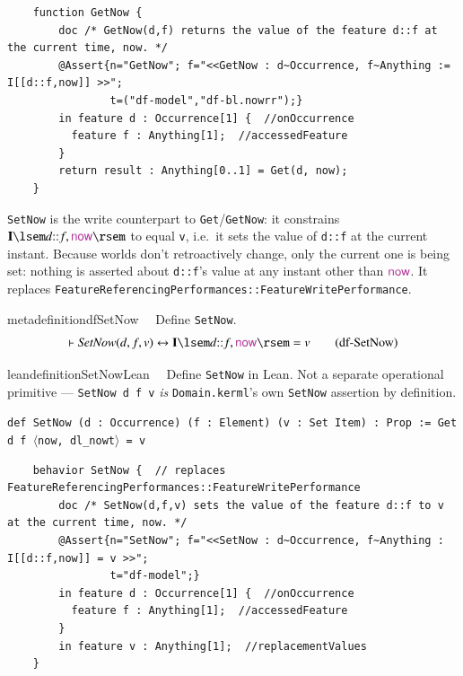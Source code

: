 \begin{lstlisting}
	function GetNow {
		doc /* GetNow(d,f) returns the value of the feature d::f at the current time, now. */
		@Assert{n="GetNow"; f="<<GetNow : d~Occurrence, f~Anything := I[[d::f,now]] >>";
				t=("df-model","df-bl.nowrr");}
		in feature d : Occurrence[1] {  //onOccurrence
		  feature f : Anything[1];  //accessedFeature
		}
		return result : Anything[0..1] = Get(d, now);
	}
\end{lstlisting}

\pn \texttt{SetNow} is the write counterpart to \texttt{Get}/\texttt{GetNow}: it constrains
$\mathbf{I}\lsem d{::}f,\mathsf{\mc{now}}\rsem$ to equal \texttt{v}, i.e.\ it sets the value of \texttt{d::f}
at the current instant. Because worlds don't retroactively change, only the current one is being set: nothing
is asserted about \texttt{d::f}'s value at any instant other than $\mathsf{\mc{now}}$. It replaces
 \texttt{FeatureReferencingPer\-form\-ances::FeatureWritePerformance}.

\begin{restatable}{metadefinition}{dfSetNow}~~ Define \texttt{SetNow}.
\begin{align}
\vdash \textit{SetNow}(d,f,v) \leftrightarrow \mathbf{I}\lsem d{::}f,\mathsf{\mc{now}}\rsem = v
\label{eq:df-SetNow}\tag{df-SetNow}
\end{align}
\end{restatable}

\begin{restatable}{leandefinition}{SetNowLean}~~ Define \texttt{SetNow} in Lean. Not a
separate operational primitive --- \texttt{SetNow d f v} \emph{is} \texttt{Domain.kerml}'s own \texttt{SetNow}
assertion by definition.

\texttt{\textcolor{leancolor}{def} \textcolor{leanyellow}{SetNow} (d : Occurrence) (f : Element) (v : Set Item) : Prop := Get d f $\langle$now, dl\_nowt$\rangle$ = v}
\label{SetNow}
\end{restatable}

\begin{lstlisting}
	behavior SetNow {  // replaces FeatureReferencingPerformances::FeatureWritePerformance
		doc /* SetNow(d,f,v) sets the value of the feature d::f to v at the current time, now. */
		@Assert{n="SetNow"; f="<<SetNow : d~Occurrence, f~Anything : I[[d::f,now]] = v >>";
				t="df-model";}
		in feature d : Occurrence[1] {  //onOccurrence
		  feature f : Anything[1];  //accessedFeature
		}
		in feature v : Anything[1];  //replacementValues
	}
\end{lstlisting}

